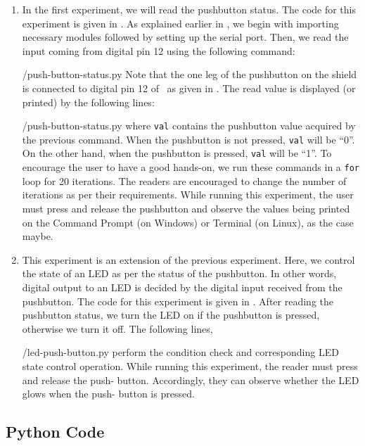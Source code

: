 \begin{enumerate}
\item In the first experiment, we will read the pushbutton status. The code for this experiment is given in
  . As explained earlier in , we begin with 
  importing necessary modules followed by setting up the serial port. 
  Then, we read the input coming from digital pin 12 using the
  following command:
  
  {\LocPushpycode/push-button-status.py} Note that the one leg of the pushbutton on
  the shield is connected to digital pin 12 of \arduino\, 
  as given in . The read value is displayed (or printed) 
 by the following lines: 
   
  {\LocPushpycode/push-button-status.py} where {\tt val} contains
  the pushbutton value acquired by the previous command. When the pushbutton is not pressed, {\tt val} will be ``0''. On the other hand,
  when the pushbutton is pressed, {\tt val} will be ``1''.
  To encourage the user to have a good hands-on, we run these commands in
  a {\tt for} loop for 20 iterations. The readers are encouraged to change the number 
  of iterations as per their requirements. While running this experiment, the user must press
  and release the pushbutton and observe the values being printed on the
  Command Prompt (on Windows) or Terminal (on Linux), as the case maybe.


\item This experiment is an extension of the previous
  experiment. Here, we control the state of an LED as per the status
  of the pushbutton. In other words, digital output to an LED is
  decided by the digital input received from the pushbutton. The code
  for this experiment is given in . After reading
  the pushbutton status, we turn the LED on if the pushbutton is
  pressed, otherwise we turn it off. The following lines,
  
  {\LocPushpycode/led-push-button.py} perform the condition check
  and corresponding LED state control operation. While running this experiment, the reader must press and release the push-
  button. Accordingly, they can observe whether the LED glows when the push-
  button is pressed.
\end{enumerate}

\subsection{Python Code}
\lstset{style=mystyle}
\label{sec:push-python-code}

